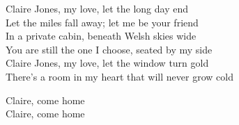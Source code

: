 \begin{lyrics}
Claire Jones, my love, let the long day end\\
Let the miles fall away; let me be your friend\\
In a private cabin, beneath Welsh skies wide\\
You are still the one I choose, seated by my side\\
Claire Jones, my love, let the window turn gold\\
There’s a room in my heart that will never grow cold

Claire, come home\\
Claire, come home
\end{lyrics}

